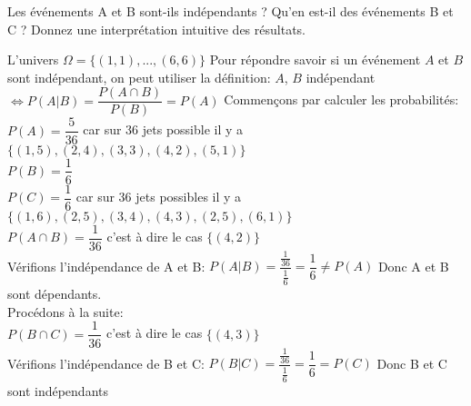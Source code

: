 \begin{exo}
  \begin{subexo}{Les événements A et B sont-ils indépendants ? Qu’en est-il des événements B et C ? Donnez une interprétation intuitive des résultats.}
    \begin{flushleft}
      L'univers $\Omega = \{(1,1),...,(6,6)\}$ Pour répondre savoir si un événement $A$ et $B$ sont indépendant, on peut utiliser la définition: $A$, $B$ indépendant $\Leftrightarrow P(A | B) = \dfrac{P(A \cap B)}{P(B)}=P(A)$ Commençons par calculer les probabilités:
      \\$P(A) = \dfrac{5}{36}$ car sur 36 jets possible il y a $\{(1,5),(2,4),(3,3),(4,2),(5,1)\}$
      \\$P(B) = \dfrac{1}{6}$
      \\$P(C) = \dfrac{1}{6}$ car sur 36 jets possibles il y a $\{(1,6),(2,5),(3,4),(4,3),(2,5),(6,1)\}$
      \\$P(A \cap B) = \dfrac{1}{36}$ c'est à dire le cas $\{(4,2)\}$
      \\Vérifions l'indépendance de A et B: $P(A | B) = \dfrac{\frac{1}{36}}{\frac{1}{6}}=\dfrac{1}{6} \neq P(A)$ Donc A et B sont dépendants.
      \\ Procédons à la suite:
      \\$P(B\cap C) = \dfrac{1}{36}$ c'est à dire le cas $\{(4,3)\}$
      \\Vérifions l'indépendance de B et C: $P(B | C) = \dfrac{\frac{1}{36}}{\frac{1}{6}}=\dfrac{1}{6} = P(C)$ Donc B et C sont indépendants
    \end{flushleft}
  \end{subexo}
\end{exo}
